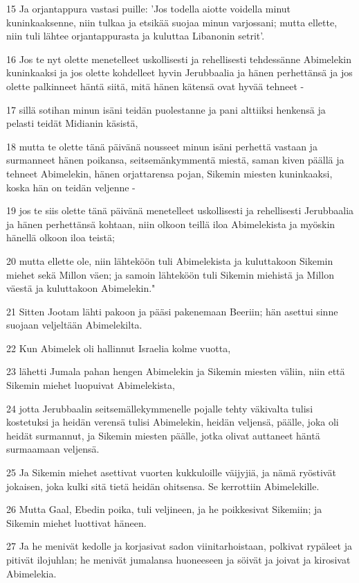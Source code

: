 \par 15 Ja orjantappura vastasi puille: 'Jos todella aiotte voidella minut kuninkaaksenne, niin tulkaa ja etsikää suojaa minun varjossani; mutta ellette, niin tuli lähtee orjantappurasta ja kuluttaa Libanonin setrit'.
\par 16 Jos te nyt olette menetelleet uskollisesti ja rehellisesti tehdessänne Abimelekin kuninkaaksi ja jos olette kohdelleet hyvin Jerubbaalia ja hänen perhettänsä ja jos olette palkinneet häntä siitä, mitä hänen kätensä ovat hyvää tehneet -
\par 17 sillä sotihan minun isäni teidän puolestanne ja pani alttiiksi henkensä ja pelasti teidät Midianin käsistä,
\par 18 mutta te olette tänä päivänä nousseet minun isäni perhettä vastaan ja surmanneet hänen poikansa, seitsemänkymmentä miestä, saman kiven päällä ja tehneet Abimelekin, hänen orjattarensa pojan, Sikemin miesten kuninkaaksi, koska hän on teidän veljenne -
\par 19 jos te siis olette tänä päivänä menetelleet uskollisesti ja rehellisesti Jerubbaalia ja hänen perhettänsä kohtaan, niin olkoon teillä iloa Abimelekista ja myöskin hänellä olkoon iloa teistä;
\par 20 mutta ellette ole, niin lähteköön tuli Abimelekista ja kuluttakoon Sikemin miehet sekä Millon väen; ja samoin lähteköön tuli Sikemin miehistä ja Millon väestä ja kuluttakoon Abimelekin."
\par 21 Sitten Jootam lähti pakoon ja pääsi pakenemaan Beeriin; hän asettui sinne suojaan veljeltään Abimelekilta.
\par 22 Kun Abimelek oli hallinnut Israelia kolme vuotta,
\par 23 lähetti Jumala pahan hengen Abimelekin ja Sikemin miesten väliin, niin että Sikemin miehet luopuivat Abimelekista,
\par 24 jotta Jerubbaalin seitsemällekymmenelle pojalle tehty väkivalta tulisi kostetuksi ja heidän verensä tulisi Abimelekin, heidän veljensä, päälle, joka oli heidät surmannut, ja Sikemin miesten päälle, jotka olivat auttaneet häntä surmaamaan veljensä.
\par 25 Ja Sikemin miehet asettivat vuorten kukkuloille väijyjiä, ja nämä ryöstivät jokaisen, joka kulki sitä tietä heidän ohitsensa. Se kerrottiin Abimelekille.
\par 26 Mutta Gaal, Ebedin poika, tuli veljineen, ja he poikkesivat Sikemiin; ja Sikemin miehet luottivat häneen.
\par 27 Ja he menivät kedolle ja korjasivat sadon viinitarhoistaan, polkivat rypäleet ja pitivät ilojuhlan; he menivät jumalansa huoneeseen ja söivät ja joivat ja kirosivat Abimelekia.
